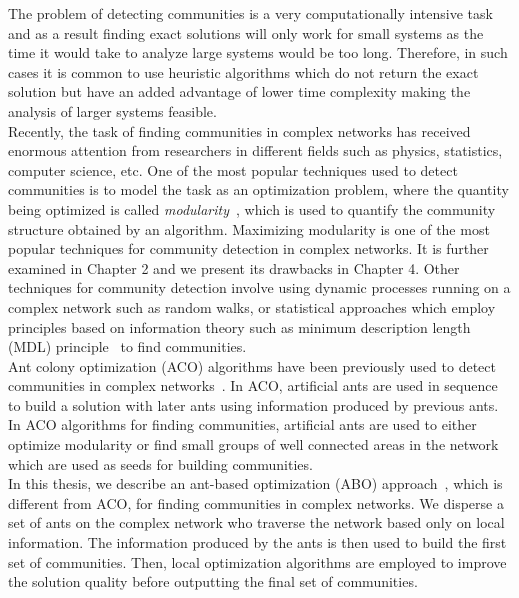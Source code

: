\begin{spacing}{1.5}
\indent The problem of detecting communities is a very computationally intensive task~\cite{Fortunato201075} and as a result finding exact solutions will only work for small systems as the time it would take to analyze large systems would be too long. Therefore, in such cases it is common to use heuristic algorithms which do not return the exact solution but have an added advantage of lower time complexity making the analysis of larger systems feasible.\\
\indent Recently, the task of finding communities in complex networks has received enormous attention from researchers in different fields such as physics, statistics, computer science, etc. One of the most popular techniques used to detect communities is to model the task as an optimization problem, where the quantity being optimized is called \emph{modularity}~\cite{PhysRevE.69.026113}, which is used to quantify the community structure obtained by an algorithm. Maximizing modularity is one of the most popular techniques for community detection in complex networks. It is further examined in Chapter 2 and we present its drawbacks in Chapter 4. Other techniques for community detection involve using  dynamic processes running on a complex network such as random walks, or statistical approaches which employ principles based on information theory such as minimum description length (MDL) principle~\cite{Rissanen1978465} to find communities.\\
\indent Ant colony optimization (ACO) algorithms have been previously used to detect communities in complex networks~\cite{DBLP:journals/corr/abs-1303-4711, 5586496, Jin:2011:ACO:2022850.2022861}. In ACO, artificial ants are used in sequence to build a solution with later ants using information produced by previous ants. In ACO algorithms for finding communities, artificial ants are used to either optimize modularity or find small groups of well connected areas in the network which are used as seeds for building communities.\\
\indent In this thesis, we describe an ant-based optimization (ABO) approach~\cite{Bui:2009:PSM:1569901.1569903}, which is different from ACO, for finding communities in complex networks. We disperse a set of ants on the complex network who traverse the network based only on local information. The information produced by the ants is then used to build the first set of communities. Then, local optimization algorithms are employed to improve the solution quality before outputting the final set of communities.\\ 

\end{spacing}

